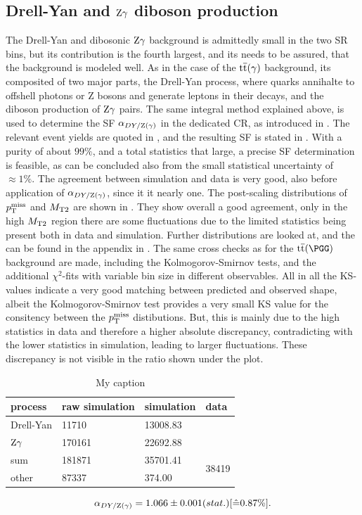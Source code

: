 \subsection{Drell-Yan and $\mathrm{Z}\gamma$ diboson production}
The Drell-Yan and dibosonic $\mathrm{Z}\gamma$ background is admittedly small in the two SR bins, but its contribution is the fourth largest, and its needs to be assured, that the background is modeled well. As in the case of the ${\mathrm{t}\overline{\mathrm{t}}}(\gamma)$ background, its composited of two major parts, the Drell-Yan process, where quarks annihalte to offshell photons or Z bosons and generate leptons in their decays, and the diboson production of $\mathrm{Z}\gamma$ pairs. The same integral method explained above, is used to determine the SF $\alpha_{DY/\mathrm{Z}(\gamma)}$ in the dedicated CR, as introduced in . The relevant event yields are quoted in , and the resulting SF is stated in . With a purity of about $99\%$, and a total statistics that large, a precise SF determination is feasible, as can be concluded also from the small statistical uncertainty of $\approx1\%$. The agreement between simulation and data is very good, also before application of $\alpha_{DY/\mathrm{Z}(\gamma)}$, since it it nearly one. The post-scaling distributions of $p_{\mathrm{T}}^\text{miss}$ and $M_{\mathrm{T2}}$ are shown in . They show overall a good agreement, only in the high $M_{\mathrm{T2}}$ region there are some fluctuations due to the limited statistics being present both in data and simulation. Further distributions are looked at, and the can be found in the appendix in . The same cross checks as for the $\ttbar(\PGG)$ background are made, including the Kolmogorov-Smirnov tests, and the additional $\chi^2$-fits with variable bin size in different observables.
All in all the KS-values indicate a very good matching between predicted and observed shape, albeit the Kolmogorov-Smirnov test provides a very small KS value for the consitency between the $p_{\mathrm{T}}^\text{miss}$ distibutions. But, this is mainly due to the high statistics in data and therefore a higher absolute discrepancy, contradicting with the lower statistics in simulation, leading to larger fluctuations. These discrepancy is not visible in the ratio shown under the plot.\\
\begin{table}[htb]
 \centering
 \caption{My caption}
 \label{tab:CRDY}
 \begin{tabular}{llll}
  
  process   & raw simulation & simulation & data                   \\\hline
  Drell-Yan & 11710          & 13008.83   &                        \\
  $\mathrm{Z}\gamma$ & 170161         & 22692.88   &                        \\\hline\hline
  sum       & 181871         & 35701.41   & \multirow{2}{*}{38419} \\
  other     & 87337          & 374.00     &                        
 \end{tabular}
\end{table}
\begin{equation}\label{eq:AlphaDY}
 \alpha_{DY/\mathrm{Z}(\gamma)}=1.066 \pm 0.001 (stat.) [\hat{=}0.87\%].
\end{equation}

